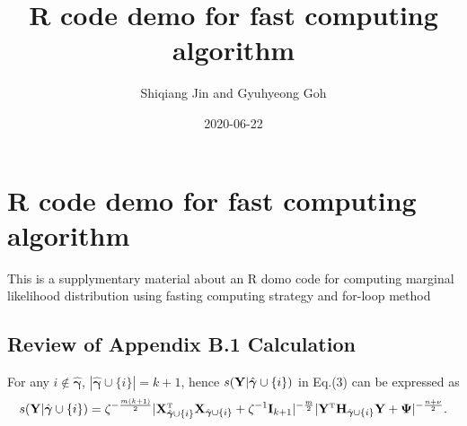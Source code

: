 \documentclass[
]{book}
\title{R code demo for fast computing algorithm}
\author{Shiqiang Jin and Gyuhyeong Goh}
\date{2020-06-22}
\begin{document}
\maketitle

{
\setcounter{tocdepth}{1}
\tableofcontents
}
\newcommand{\uA}{{\bf A}}
\newcommand{\ua}{{\bf a}}
\newcommand{\uB}{{\bf B}}
\newcommand{\ub}{{\bf b}}
\newcommand{\uC}{{\bf C}}
\newcommand{\uc}{{\bf c}}
\newcommand{\ud}{{\bf d}}
\newcommand{\ue}{{\bf e}}
\newcommand{\uE}{{\bf E}}
\newcommand{\uH}{{\bf H}}
\newcommand{\uI}{{\bf I}}
\newcommand{\uK}{{\bf K}}
\newcommand{\bP}{{\bf P}}
\newcommand{\uQ}{{\bf Q}}
\newcommand{\uv}{{\bf v}}
\newcommand{\uV}{{\bf V}}
\newcommand{\us}{{\bf s}}
\newcommand{\T}{{ \mathrm{\scriptscriptstyle T} }}
\newcommand{\uU}{{\bf U}}
\newcommand{\uu}{{\bf u}}
\newcommand{\uX}{{\bf X}}
\newcommand{\ux}{{\bf x}}
\newcommand{\uY}{{\bf Y}}
\newcommand{\uy}{{\bf y}}

\newcommand{\0}{{\bf 0}}
\newcommand{\1}{{\boldsymbol 1}}
\newcommand{\ualpha}{{\boldsymbol \alpha}}
\newcommand{\ubeta}{{\boldsymbol \beta}}
\newcommand{\diag}{{\rm diag}}
\newcommand{\uepsilon}{{\boldsymbol \epsilon}}
\newcommand{\ueta}{{\boldsymbol \eta}}
\newcommand{\bg}{{\boldsymbol \gamma}}
\newcommand{\bOmega}{{\boldsymbol\Omega}}
\newcommand{\uPsi}{{\boldsymbol \Psi}}
\newcommand{\uSigma}{{\boldsymbol \Sigma}}
\newcommand{\uxi}{{\boldsymbol \xi}}
\newcommand{\nbd}{{\text{nbd}}}

\hypertarget{r-code-demo-for-fast-computing-algorithm}{%
\chapter{R code demo for fast computing algorithm}\label{r-code-demo-for-fast-computing-algorithm}}

This is a supplymentary material about an R domo code for computing marginal likelihood distribution using fasting computing strategy and for-loop method

\hypertarget{review-of-appendix-b.1-calculation}{%
\section{Review of Appendix B.1 Calculation}\label{review-of-appendix-b.1-calculation}}

For any \(i\notin\hat{\boldsymbol \gamma}\), \(|\hat{\boldsymbol \gamma}\cup\{i\}|=k+1\), hence \(s({\bf Y}|\hat{\boldsymbol \gamma}\cup\{i\})\) in Eq.(3) can be expressed as
\begin{eqnarray}
s({\bf Y}|\hat{\boldsymbol \gamma}\cup\{i\})={\zeta}^{-\frac{m(k+1)}{2}}|{\bf X}_{\hat{\boldsymbol \gamma}\cup\{i\}}^{{ \mathrm{\scriptscriptstyle T} }}{\bf X}_{\hat{\boldsymbol \gamma}\cup\{i\}}+\zeta^{-1}{\bf I}_{k+1}|^{-\frac{m}{2}}| {\bf Y}^{{ \mathrm{\scriptscriptstyle T} }}{\bf H}_{\hat{\boldsymbol \gamma}\cup\{i\}}{\bf Y}+{\boldsymbol \Psi}|^{-\frac{n+\nu}{2}}.
\label{eq:1}
\end{eqnarray}
\end{document}
